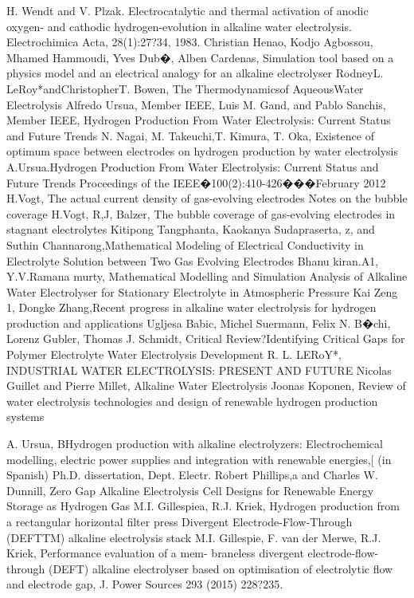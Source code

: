 \begin{thebibliography}{9}
H. Wendt and V. Plzak. Electrocatalytic and thermal activation of anodic oxygen- and cathodic hydrogen-evolution in alkaline water electrolysis. Electrochimica Acta, 28(1):27?34, 1983.
Christian Henao, Kodjo Agbossou, Mhamed Hammoudi, Yves Dub�, Alben Cardenas, Simulation tool based on a physics model and an electrical analogy for an alkaline electrolyser
RodneyL. LeRoy*andChristopherT. Bowen, The Thermodynamicsof AqueousWater Electrolysis
Alfredo Ursua, Member IEEE, Luis M. Gand, and Pablo Sanchis, Member IEEE, Hydrogen Production From
Water Electrolysis: Current Status and Future Trends
N. Nagai, M. Takeuchi,T. Kimura, T. Oka, Existence of optimum space between electrodes on hydrogen production by water electrolysis
A.Ursua.Hydrogen Production From Water Electrolysis: Current Status and Future Trends Proceedings of the IEEE�100(2):410-426���February 2012
H.Vogt, The actual current density of gas-evolving electrodes Notes on the bubble coverage
H.Vogt, R,J, Balzer, The bubble coverage of gas-evolving electrodes in stagnant electrolytes
Kitipong Tangphanta, Kaokanya Sudapraserta, z, and Suthin Channarong,Mathematical Modeling of Electrical Conductivity
in Electrolyte Solution between Two Gas Evolving Electrodes
Bhanu kiran.A1, Y.V.Ramana murty, Mathematical Modelling and Simulation Analysis of Alkaline Water Electrolyser for Stationary Electrolyte in Atmospheric Pressure
Kai Zeng 1, Dongke Zhang,Recent progress in alkaline water electrolysis for hydrogen production and applications
Ugljesa Babic, Michel Suermann, Felix N. B�chi, Lorenz Gubler, Thomas J. Schmidt, Critical Review?Identifying Critical Gaps for Polymer Electrolyte Water Electrolysis Development
R. L. LERoY*, INDUSTRIAL WATER ELECTROLYSIS: PRESENT AND FUTURE
Nicolas Guillet and Pierre Millet, Alkaline Water Electrolysis
Joonas Koponen, Review of water electrolysis technologies and design of renewable hydrogen production systems

A. Ursua, BHydrogen production with alkaline electrolyzers: Electrochemical modelling, electric power supplies
and integration with renewable energies,[ (in Spanish) Ph.D. dissertation, Dept. Electr.
Robert Phillips,a and Charles W. Dunnill,  Zero Gap Alkaline Electrolysis Cell Designs for
 Renewable Energy Storage as Hydrogen Gas
M.I. Gillespiea, R.J. Kriek, Hydrogen production from a rectangular horizontal filter press Divergent Electrode-Flow-Through (DEFTTM) alkaline electrolysis stack
M.I. Gillespie, F. van der Merwe, R.J. Kriek, Performance evaluation of a mem-
braneless divergent electrode-flow-through (DEFT) alkaline electrolyser based on optimisation of electrolytic flow and electrode gap, J. Power Sources 293 (2015) 228?235.


\end{thebibliography}
